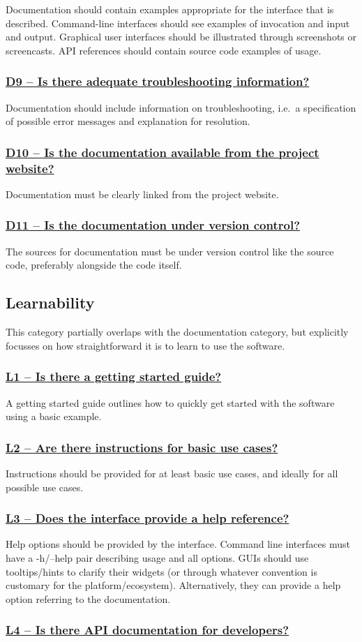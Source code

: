 \documentclass[a4paper,11pt]{article}
\newcommand{\criterion}[1]{\subsubsection*{\underline{#1}}}
\begin{document}
Documentation should contain examples appropriate for the interface that is
described. Command-line interfaces should see examples of invocation and input
and output. Graphical user interfaces should be illustrated through screenshots or
screencasts. API references should contain source code examples of usage.

\criterion{D9 -- Is there adequate troubleshooting information?}

Documentation should include information on troubleshooting, i.e.\ a
specification of possible error messages and explanation for resolution.

\criterion{D10 -- Is the documentation available from the project website?}

Documentation must be clearly linked from the project website.

\criterion{D11 -- Is the documentation under version control?}

The sources for documentation must be under version control like the source
code, preferably alongside the code itself.

\subsection{Learnability}

This category partially overlaps with the documentation category, but explicitly
focusses on how straightforward it is to learn to use the software.

\criterion{L1 -- Is there a getting started guide?}

A getting started guide outlines how to quickly get started with the software
using a basic example.

\criterion{L2 -- Are there instructions for basic use cases?}

Instructions should be provided for at least basic use cases, and ideally for
all possible use cases.

\criterion{L3 -- Does the interface provide a help reference?}

Help options should be provided by the interface. Command line interfaces must
have a -h/--help pair describing usage and all options. GUIs should use tooltips/hints to clarify
their widgets (or through whatever convention is customary for the
platform/ecosystem). Alternatively, they can provide a help option referring to
the documentation.

\criterion{L4 -- Is there API documentation for developers?}
\end{document}

